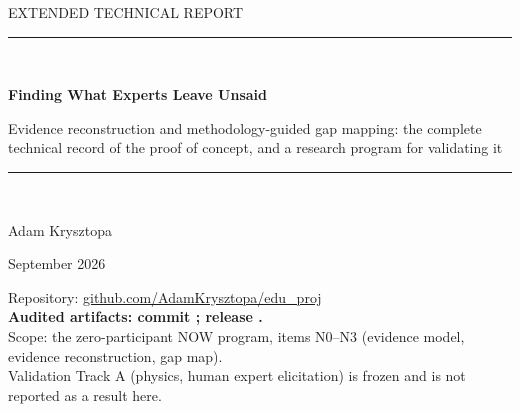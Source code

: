 \documentclass[a4paper,11pt]{scrartcl}
\newcommand{\reporttitle}{Finding What Experts Leave Unsaid}
\newcommand{\reportsubtitle}{Evidence reconstruction and methodology-guided gap
  mapping: the complete technical record of the proof of concept, and a
  research program for validating it}
\newcommand{\reportauthor}{Adam Krysztopa}
\newcommand{\reportdate}{September 2026}
\begin{document}
\begin{titlepage}
  \sffamily
  \begin{flushleft}
    \color{gray700}\small\MakeUppercase{Extended Technical Report}\\[10mm]
  \end{flushleft}
  \vspace{0.08\textheight}
  \textcolor{accent}{\rule{\linewidth}{1.4pt}}\\[6mm]
  {
   \bfseries\fontsize{30}{36}\selectfont\color{ink}\reporttitle\par}
  \vspace{4mm}
  {\fontsize{14}{18}\selectfont\color{gray700}\reportsubtitle\par}
  \vspace{6mm}
  \textcolor{accent}{\rule{\linewidth}{1.4pt}}\\[10mm]
  \vfill
  \begin{flushleft}
    {\large\reportauthor\par}
    \vspace{1mm}
    {\color{gray700}\reportdate\par}
    \vspace{6mm}
    {\small\color{gray700}
      Repository: \href{https://github.com/AdamKrysztopa/edu_proj}{github.com/AdamKrysztopa/edu\_proj}\\
      \textbf{Audited artifacts: commit
      \href{https://github.com/AdamKrysztopa/edu_proj/tree/\auditcommit}{\texttt{\auditshort}};
      release \href{https://github.com/AdamKrysztopa/edu_proj/releases/tag/\reporelease}{\texttt{\reporelease}}.}\\
      Scope: the zero-participant NOW program, items N0--N3 (evidence model,
      evidence reconstruction, gap map).\\
      Validation Track A (physics, human expert elicitation) is frozen and
      is not reported as a result here.\par}
  \end{flushleft}
\end{titlepage}

\end{document}
